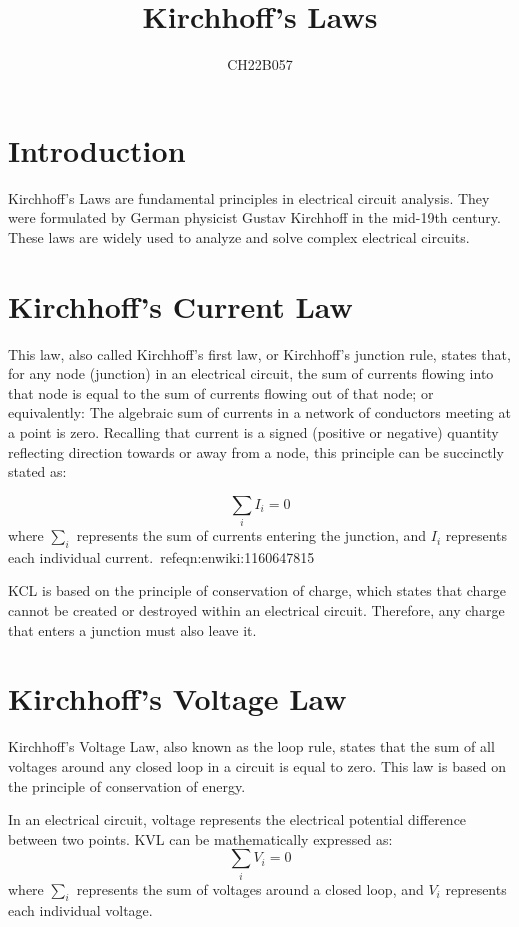 \documentclass{article}
\begin{document}
\title{Kirchhoff's Laws}
\author{CH22B057}

\maketitle

\section{Introduction}
Kirchhoff's Laws are fundamental principles in electrical circuit analysis. They were formulated by German physicist Gustav Kirchhoff in the mid-19th century. These laws are widely used to analyze and solve complex electrical circuits.

\section{Kirchhoff's Current Law}
This law, also called Kirchhoff's first law, or Kirchhoff's junction rule, states that, for any node (junction) in an electrical circuit, the sum of currents flowing into that node is equal to the sum of currents flowing out of that node; or equivalently: 
      The algebraic sum of currents in a network of conductors meeting at a point is zero.
Recalling that current is a signed (positive or negative) quantity reflecting direction towards or away from a node, this principle can be succinctly stated as: 

\begin{equation}
\sum_{i} I_i = 0
\end{equation}
where $\sum_{i}$ represents the sum of currents entering the junction, and $I_i$ represents each individual current.~ref{eqn:enwiki:1160647815}

KCL is based on the principle of conservation of charge, which states that charge cannot be created or destroyed within an electrical circuit. Therefore, any charge that enters a junction must also leave it.

\section{Kirchhoff's Voltage Law}
Kirchhoff's Voltage Law, also known as the loop rule, states that the sum of all voltages around any closed loop in a circuit is equal to zero. This law is based on the principle of conservation of energy.

In an electrical circuit, voltage represents the electrical potential difference between two points. KVL can be mathematically expressed as:
\begin{equation}
\sum_{i} V_i = 0
\end{equation}
where $\sum_{i}$ represents the sum of voltages around a closed loop, and $V_i$ represents each individual voltage.
\end{document}
